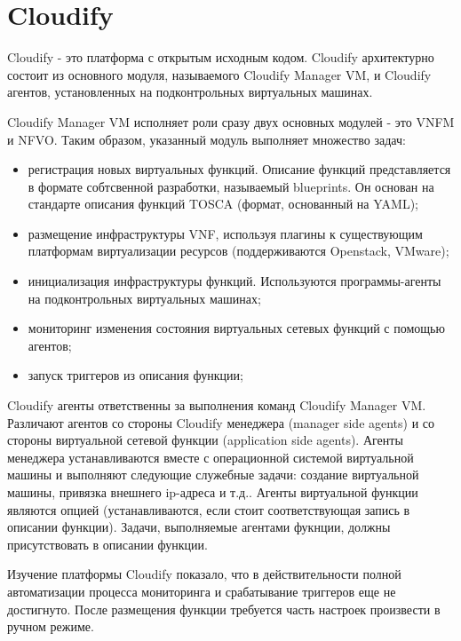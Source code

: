 \documentclass[oneside,final,14pt,a4paper]{extreport}
\begin{document}
\section{Cloudify}
Cloudify - это платформа с открытым исходным кодом. Cloudify архитектурно состоит из основного модуля, называемого Cloudify Manager VM, и Cloudify агентов, установленных на подконтрольных виртуальных машинах. 

Cloudify Manager VM исполняет роли сразу двух основных модулей - это VNFM и NFVO. Таким образом, указанный модуль выполняет множество задач:
\begin{itemize}
	\item регистрация новых виртуальных функций. Описание функций представляется в формате собтсвенной разработки, называемый blueprints. Он основан на стандарте описания функций TOSCA (формат, основанный на YAML);
	\item размещение инфраструктуры VNF, используя плагины к существующим платформам виртуализации ресурсов (поддерживаются Openstack, VMware);
	\item инициализация инфраструктуры функций. Используются программы-агенты на подконтрольных виртуальных машинах;
	\item мониторинг изменения состояния виртуальных сетевых функций с помощью агентов;
	\item запуск триггеров из описания функции;
\end{itemize}

Cloudify агенты ответственны за выполнения команд Cloudify Manager VM. Различают агентов со стороны Cloudify менеджера (manager side agents) и со стороны виртуальной сетевой функции (application side agents). Агенты менеджера устанавливаются вместе с операционной системой виртуальной машины и выполняют следующие служебные задачи: создание виртуальной машины, привязка внешнего ip-адреса и т.д.. Агенты виртуальной функции являются опцией (устанавливаются, если стоит соответствующая запись в описании функции). Задачи, выполняемые агентами фукнции, должны присутствовать в описании функции.\cite{cloudify-official-oveview1}

Изучение платформы Cloudify показало, что в действительности полной автоматизации процесса мониторинга и срабатывание триггеров еще не достигнуто. После размещения функции требуется часть настроек произвести в ручном режиме. 
\end{document}
